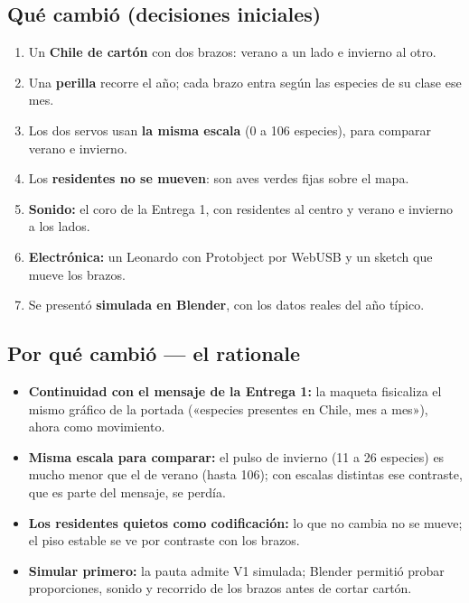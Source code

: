 \documentclass[11pt,a4paper]{article}
\begin{document}
\subsection*{Qué cambió (decisiones iniciales)}
\begin{enumerate}
\item Un \textbf{Chile de cartón} con dos brazos: verano a un lado e invierno al otro.
\item Una \textbf{perilla} recorre el año; cada brazo entra según las especies de su clase ese mes.
\item Los dos servos usan \textbf{la misma escala} (0 a 106 especies), para comparar verano e invierno.
\item Los \textbf{residentes no se mueven}: son aves verdes fijas sobre el mapa.
\item \textbf{Sonido:} el coro de la Entrega 1, con residentes al centro y verano e invierno a los lados.
\item \textbf{Electrónica:} un Leonardo con Protobject por WebUSB y un sketch que mueve los brazos.
\item Se presentó \textbf{simulada en Blender}, con los datos reales del año típico.
\end{enumerate}
\subsection*{Por qué cambió --- el rationale}
\begin{itemize}
\item \textbf{Continuidad con el mensaje de la Entrega 1:} la maqueta fisicaliza el mismo gráfico de la portada («especies presentes en Chile, mes a mes»), ahora como movimiento.
\item \textbf{Misma escala para comparar:} el pulso de invierno (11 a 26 especies) es mucho menor que el de verano (hasta 106); con escalas distintas ese contraste, que es parte del mensaje, se perdía.
\item \textbf{Los residentes quietos como codificación:} lo que no cambia no se mueve; el piso estable se ve por contraste con los brazos.
\item \textbf{Simular primero:} la pauta admite V1 simulada; Blender permitió probar proporciones, sonido y recorrido de los brazos antes de cortar cartón.
\end{itemize}
\end{document}
